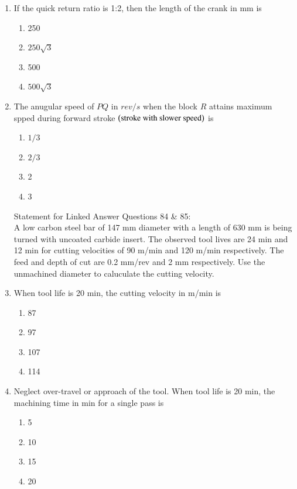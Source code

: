 \documentclass[journal,12pt,onecolumn,article]{IEEEtran}
\theoremstyle{remark}
\begin{document}
\begin{enumerate}
	\item If the quick return ratio is 1:2, then the length of the crank in mm is 
		\begin{enumerate}
			\item 250
			\item $250\sqrt{3}$
			\item 500
			\item $500\sqrt{3}$
		\end{enumerate}
	\item The anugular speed of $PQ$ in $rev/s$ when the block $R$ attains maximum spped during forward stroke $\left(\text{stroke with slower speed}\right)$ is 
		\begin{enumerate}
			\item $1/3$
			\item $2/3$
			\item 2
			\item $3$
		\end{enumerate}
		Statement for Linked Answer Questions 84 \& 85: \\
		A low carbon steel bar of 147 mm diameter with a length of 630 mm is being turned with uncoated carbide insert. The observed tool lives are 24 min and 12 min for cutting velocities of 90 m/min and 120 m/min respectively. The feed and depth of cut are 0.2 mm/rev and 2 mm respectively. Use the unmachined diameter to caluculate the cutting velocity. 
	\item When tool life is 20 min, the cutting velocity in m/min is
		\begin{enumerate}
		\item 87
		\item 97
		\item 107
		\item 114
		\end{enumerate}
	\item Neglect over-travel or approach of the tool. When tool life is 20 min, the machining time in min for a single pass is 
		\begin{enumerate}
			\item 5
			\item 10
			\item 15
			\item 20
		\end{enumerate}

\end{enumerate}
\end{document}
